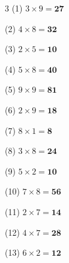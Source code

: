 \documentclass[a4paper, 11pt]{ltjsarticle}
\begin{document}
\hfill

\vspace*{2ex}

\vspace*{5ex}

\begin{multicols*}{3}
\noindent (1) \quad $3 \times 9 = \mathbf{27}$
\vspace*{\fill}

\noindent (2) \quad $4 \times 8 = \mathbf{32}$
\vspace*{\fill}

\noindent (3) \quad $2 \times 5 = \mathbf{10}$
\vspace*{\fill}

\noindent (4) \quad $5 \times 8 = \mathbf{40}$
\vspace*{\fill}

\noindent (5) \quad $9 \times 9 = \mathbf{81}$
\vspace*{\fill}

\noindent (6) \quad $2 \times 9 = \mathbf{18}$
\vspace*{\fill}

\noindent (7) \quad $8 \times 1 = \mathbf{8}$
\vspace*{\fill}

\noindent (8) \quad $3 \times 8 = \mathbf{24}$
\vspace*{\fill}

\noindent (9) \quad $5 \times 2 = \mathbf{10}$
\vspace*{\fill}

\noindent (10) \quad $7 \times 8 = \mathbf{56}$
\vspace*{\fill}

\noindent (11) \quad $2 \times 7 = \mathbf{14}$
\vspace*{\fill}

\noindent (12) \quad $4 \times 7 = \mathbf{28}$
\vspace*{\fill}
\columnbreak

\noindent (13) \quad $6 \times 2 = \mathbf{12}$
\vspace*{\fill}


\end{multicols*}
\end{document}
